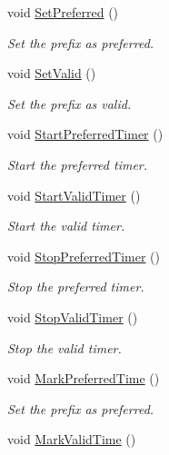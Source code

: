 \begin{DoxyCompactItemize}
void \hyperlink{classns3_1_1Ipv6AutoconfiguredPrefix_a1e699f92e46bd013db5b032bfc804e1d}{Set\+Preferred} ()
\begin{DoxyCompactList}\small\item\em Set the prefix as preferred. \end{DoxyCompactList}\item 
void \hyperlink{classns3_1_1Ipv6AutoconfiguredPrefix_a7642ede5d6ff09c2f31bc464d8a7a71f}{Set\+Valid} ()
\begin{DoxyCompactList}\small\item\em Set the prefix as valid. \end{DoxyCompactList}\item 
void \hyperlink{classns3_1_1Ipv6AutoconfiguredPrefix_a8b1e842e9c7b957c34b942d57faa23e0}{Start\+Preferred\+Timer} ()
\begin{DoxyCompactList}\small\item\em Start the preferred timer. \end{DoxyCompactList}\item 
void \hyperlink{classns3_1_1Ipv6AutoconfiguredPrefix_ad1df9fbb954d609282e763f76b8f904f}{Start\+Valid\+Timer} ()
\begin{DoxyCompactList}\small\item\em Start the valid timer. \end{DoxyCompactList}\item 
void \hyperlink{classns3_1_1Ipv6AutoconfiguredPrefix_abe438ae290322b065c22e85562ee98ac}{Stop\+Preferred\+Timer} ()
\begin{DoxyCompactList}\small\item\em Stop the preferred timer. \end{DoxyCompactList}\item 
void \hyperlink{classns3_1_1Ipv6AutoconfiguredPrefix_a2dde67d8291e0f0eeb17127e06822f4a}{Stop\+Valid\+Timer} ()
\begin{DoxyCompactList}\small\item\em Stop the valid timer. \end{DoxyCompactList}\item 
void \hyperlink{classns3_1_1Ipv6AutoconfiguredPrefix_adae964bcc75a3b6f8089c5297cde34b4}{Mark\+Preferred\+Time} ()
\begin{DoxyCompactList}\small\item\em Set the prefix as preferred. \end{DoxyCompactList}\item 
void \hyperlink{classns3_1_1Ipv6AutoconfiguredPrefix_affb2db94313ba74ea579ecfa1692f3d1}{Mark\+Valid\+Time} ()

\end{DoxyCompactItemize}
